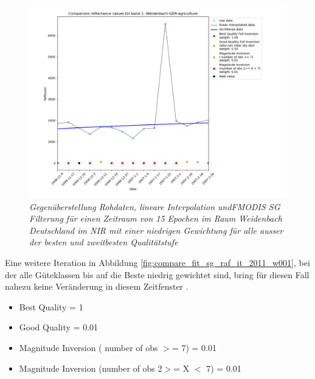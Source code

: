 \documentclass[11pt]{report}
\begin{document}
\begin{figure}[H]
\includegraphics[scale=0.6]{./Grafiken/Fitting/Fitting_method_comparison/comparison_reflectance_values_for_2007001_band_2_Weidenbach_GER_agriculture_1_050_001_001.png}
\caption{\textit{Gegenüberstellung Rohdaten, lineare Interpolation undFMODIS
 SG Filterung für einen Zeitraum von 15 Epochen im Raum Weidenbach Deutschland im NIR mit einer niedrigen Gewichtung für alle ausser der besten und zweitbesten Qualitätstufe }}
\label{fig:compare_fit_sg_raf_it_2011_w001_050}
\end{figure}
Eine weitere Iteration in Abbildung \ref{fig:compare_fit_sg_raf_it_2011_w001}, bei der alle Güteklassen bis auf die Beste niedrig gewichtet sind, bring für diesen Fall nahezu keine Veränderung in diesem Zeitfenster . 
\begin{itemize}
\item Best Quality = 1 
\item Good Quality = 0.01
\item Magnitude Inversion ( number of obs $>$= 7) = 0.01
\item Magnitude Inversion (number of obs 2$>$= X $<$ 7) = 0.01
\end{itemize}
\end{document}
